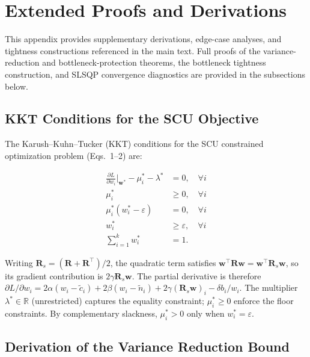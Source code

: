 \documentclass[pdflatex,sn-mathphys-num]{sn-jnl}
\begin{document}
\section{Extended Proofs and Derivations}
\label{app:proofs}

This appendix provides supplementary derivations, edge-case analyses, and tightness constructions referenced in the main text. Full proofs of the variance-reduction and bottleneck-protection theorems, the bottleneck tightness construction, and SLSQP convergence diagnostics are provided in the subsections below.

\subsection{KKT Conditions for the SCU Objective}
\label{app:kkt}

The Karush--Kuhn--Tucker (KKT) conditions for the SCU constrained optimization problem (Eqs.~1--2) are:

\begin{align}
\frac{\partial L}{\partial w_i}\bigg|_{\mathbf{w}^*} - \mu_i^* - \lambda^* &= 0, \quad \forall i \\
\mu_i^* &\ge 0, \quad \forall i \\
\mu_i^*(w_i^* - \varepsilon) &= 0, \quad \forall i \\
w_i^* &\ge \varepsilon, \quad \forall i \\
\sum_{i=1}^k w_i^* &= 1.
\end{align}

Writing $\mathbf{R}_{s}=(\mathbf{R}+\mathbf{R}^{\top})/2$, the quadratic term satisfies $\mathbf{w}^{\top}\mathbf{R}\mathbf{w}=\mathbf{w}^{\top}\mathbf{R}_{s}\mathbf{w}$, so its gradient contribution is $2\gamma\mathbf{R}_{s}\mathbf{w}$. The partial derivative is therefore $\partial L / \partial w_i = 2\alpha(w_i - \tilde{c}_i) + 2\beta(w_i - \tilde{n}_i) + 2\gamma(\mathbf{R}_{s}\mathbf{w})_i - \delta b_i / w_i$. The multiplier $\lambda^* \in \mathbb{R}$ (unrestricted) captures the equality constraint; $\mu_i^* \ge 0$ enforce the floor constraints. By complementary slackness, $\mu_i^* > 0$ only when $w_i^* = \varepsilon$.

\subsection{Derivation of the Variance Reduction Bound}
\label{app:variance-derivation}
\end{document}

